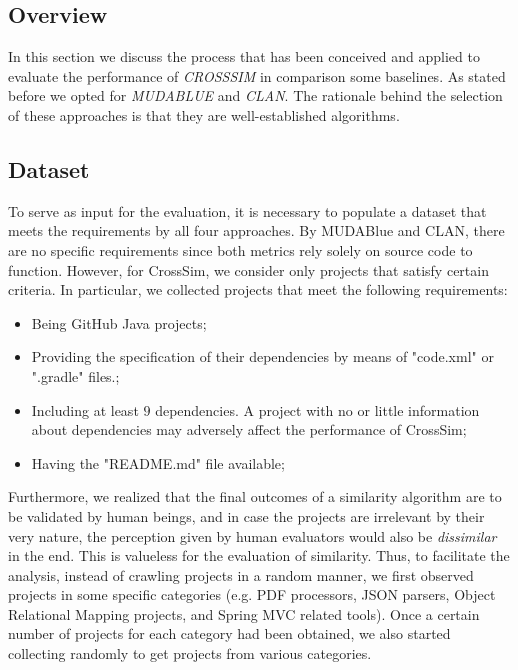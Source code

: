 \subsection{Overview}
In this section we discuss the process that has been conceived and applied to evaluate the
performance of \emph{CROSSSIM} in comparison some baselines. As stated before we opted for \emph{MUDABLUE} and
\emph{CLAN}. The rationale behind the selection of these approaches is that they are well-established algorithms.

\subsection{Dataset}

To serve as input for the evaluation, it is necessary to populate a dataset that meets the requirements by all four approaches. By MUDABlue and CLAN, there are no specific requirements since both metrics rely solely on source code to function. However, for CrossSim, we consider only projects that satisfy certain criteria. In particular, we collected projects that meet the following requirements:

\begin{itemize}
	\item Being GitHub Java projects; 
	\item Providing the specification of their dependencies by means of "code.xml" or ".gradle" files.;
	\item Including at least $9$ dependencies. A project with no or little information about dependencies may adversely affect the performance of CrossSim; 
	\item Having the "README.md" file available; 
\end{itemize}

Furthermore, we realized that the final outcomes of a similarity algorithm are to be validated by human beings, and in case the projects are irrelevant by their very nature, the perception given by human evaluators would also be \emph{dissimilar} in the end. This is valueless for the evaluation of similarity. Thus, to facilitate the analysis, instead of crawling projects in a random manner, we first observed projects in some specific categories (e.g. PDF processors, JSON parsers, Object Relational Mapping projects, and Spring MVC related tools). Once a certain number of projects for each category had been obtained, we also started collecting randomly to get projects from various categories.

